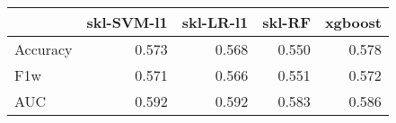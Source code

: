 \begin{tabular}{lrrrr}
\toprule
{} &  skl-SVM-l1 &  skl-LR-l1 &  skl-RF &  xgboost \\
\midrule
Accuracy &       0.573 &      0.568 &   0.550 &    0.578 \\
F1w      &       0.571 &      0.566 &   0.551 &    0.572 \\
AUC      &       0.592 &      0.592 &   0.583 &    0.586 \\
\bottomrule
\end{tabular}
